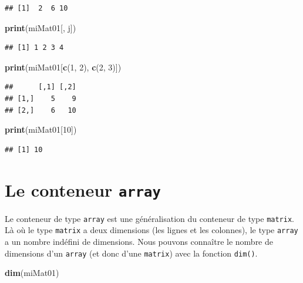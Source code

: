 \documentclass[
]{book}
\newenvironment{Shaded}{\begin{snugshade}}{\end{snugshade}}
\newcommand{\DecValTok}[1]{\textcolor[rgb]{0.00,0.00,0.81}{#1}}
\newcommand{\KeywordTok}[1]{\textcolor[rgb]{0.13,0.29,0.53}{\textbf{#1}}}
\newcommand{\NormalTok}[1]{#1}
\begin{document}
\begin{verbatim}
## [1]  2  6 10
\end{verbatim}

\begin{Shaded}
\begin{Highlighting}[]
\KeywordTok{print}\NormalTok{(miMat01[, j])}
\end{Highlighting}
\end{Shaded}

\begin{verbatim}
## [1] 1 2 3 4
\end{verbatim}

\begin{Shaded}
\begin{Highlighting}[]
\KeywordTok{print}\NormalTok{(miMat01[}\KeywordTok{c}\NormalTok{(}\DecValTok{1}\NormalTok{, }\DecValTok{2}\NormalTok{), }\KeywordTok{c}\NormalTok{(}\DecValTok{2}\NormalTok{, }\DecValTok{3}\NormalTok{)])}
\end{Highlighting}
\end{Shaded}

\begin{verbatim}
##      [,1] [,2]
## [1,]    5    9
## [2,]    6   10
\end{verbatim}

\begin{Shaded}
\begin{Highlighting}[]
\KeywordTok{print}\NormalTok{(miMat01[}\DecValTok{10}\NormalTok{])}
\end{Highlighting}
\end{Shaded}

\begin{verbatim}
## [1] 10
\end{verbatim}

\hypertarget{l014array}{%
\section{\texorpdfstring{Le conteneur \texttt{array}}{Le conteneur array}}\label{l014array}}

Le conteneur de type \texttt{array} est une généralisation du conteneur de type \texttt{matrix}. Là où le type \texttt{matrix} a deux dimensions (les lignes et les colonnes), le type \texttt{array} a un nombre indéfini de dimensions. Nous pouvons connaître le nombre de dimensions d'un \texttt{array} (et donc d'une \texttt{matrix}) avec la fonction \texttt{dim()}.

\begin{Shaded}
\begin{Highlighting}[]
\KeywordTok{dim}\NormalTok{(miMat01)}
\end{Highlighting}
\end{Shaded}
\end{document}
